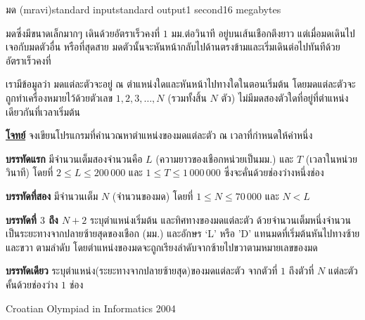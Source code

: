 \documentclass[11pt,a4paper]{article}
\begin{document}
\begin{problem}{มด (mravi)}{standard input}{standard output}{1 second}{16 megabytes}

มดซึ่งมีขนาดเล็กมากๆ เดินด้วยอัตราเร็วคงที่ $1$ มม.ต่อวินาที อยู่บนเส้นเชือกตึงยาว แต่เมื่อมดเดินไปเจอกับมดตัวอื่น หรือที่สุดสาย มดตัวนั้นจะหันหน้ากลับไปด้านตรงข้ามและเริ่มเดินต่อไปทันทีด้วยอัตราเร็วคงที่

    เรามีข้อมูลว่า มดแต่ละตัวจะอยู่ ณ ตำแหน่งใดและหันหน้าไปทางใดในตอนเริ่มต้น โดยมดแต่ละตัวจะถูกทำเครื่องหมายไว้ด้วยตัวเลข $1, 2, 3, …, N$ (รวมทั้งสิ้น $N$ ตัว) ไม่มีมดสองตัวใดที่อยู่ที่ตำแหน่งเดียวกันที่เวลาเริ่มต้น

\bigskip
\underline{\textbf{โจทย์}}  จงเขียนโปรแกรมที่คำนวณหาตำแหน่งของมดแต่ละตัว ณ เวลาที่กำหนดให้ค่าหนึ่ง

\InputFile

\textbf{บรรทัดแรก} มีจำนวนเต็มสองจำนวนคือ $L$ (ความยาวของเชือกหน่วยเป็นมม.) และ $T$ (เวลาในหน่วยวินาที) โดยที่ $2 \leq L \leq 200\,000$ และ $1 \leq T \leq 1\,000\,000$ ซึ่งจะคั่นด้วยช่องว่างหนึ่งช่อง

\textbf{บรรทัดที่สอง} มีจำนวนเต็ม $N$ (จำนวนของมด) โดยที่ $1 \leq N \leq 70\,000$ และ $N < L$

\textbf{บรรทัดที่ $3$ ถึง $N+2$} ระบุตำแหน่งเริ่มต้น และทิศทางของมดแต่ละตัว ด้วยจำนวนเต็มหนึ่งจำนวน เป็นระยะทางจากปลายซ้ายสุดของเชือก (มม.) และอักษร ‘L’ หรือ ’D’ แทนมดที่เริ่มต้นหันไปทางซ้ายและขวา ตามลำดับ โดยตำแหน่งของมดจะถูกเรียงลำดับจากซ้ายไปขวาตามหมายเลขของมด


\OutputFile

\textbf{บรรทัดเดียว} ระบุตำแหน่ง(ระยะทางจากปลายซ้ายสุด)ของมดแต่ละตัว จากตัวที่ $1$ ถึงตัวที่ $N$ แต่ละตัวคั้นด้วยช่องว่าง $1$ ช่อง

\Examples

\begin{example}
%
%
%
\end{example}


\Source

Croatian Olympiad in Informatics 2004

\end{problem}
\end{document}
